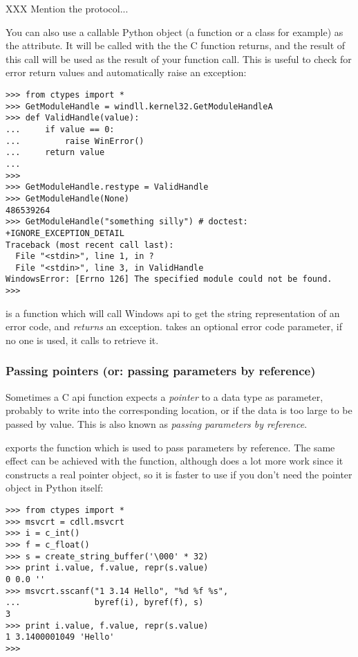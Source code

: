 XXX Mention the  protocol...

You can also use a callable Python object (a function or a class for
example) as the  attribute.  It will be called with the
 the C function returns, and the result of this call will
be used as the result of your function call. This is useful to check
for error return values and automatically raise an exception:
\begin{verbatim}
>>> from ctypes import *
>>> GetModuleHandle = windll.kernel32.GetModuleHandleA
>>> def ValidHandle(value):
...     if value == 0:
...         raise WinError()
...     return value
...
>>>
>>> GetModuleHandle.restype = ValidHandle
>>> GetModuleHandle(None)
486539264
>>> GetModuleHandle("something silly") # doctest: +IGNORE_EXCEPTION_DETAIL
Traceback (most recent call last):
  File "<stdin>", line 1, in ?
  File "<stdin>", line 3, in ValidHandle
WindowsError: [Errno 126] The specified module could not be found.
>>>
\end{verbatim}

 is a function which will call Windows 
api to get the string representation of an error code, and \emph{returns}
an exception.   takes an optional error code parameter, if
no one is used, it calls  to retrieve it.


\subsubsection{Passing pointers (or: passing parameters by reference)\label{ctypes-passing-pointers}}

Sometimes a C api function expects a \emph{pointer} to a data type as
parameter, probably to write into the corresponding location, or if
the data is too large to be passed by value. This is also known as
\emph{passing parameters by reference}.

 exports the  function which is used to pass
parameters by reference.  The same effect can be achieved with the
 function, although  does a lot more work since
it constructs a real pointer object, so it is faster to use 
if you don't need the pointer object in Python itself:
\begin{verbatim}
>>> from ctypes import *
>>> msvcrt = cdll.msvcrt
>>> i = c_int()
>>> f = c_float()
>>> s = create_string_buffer('\000' * 32)
>>> print i.value, f.value, repr(s.value)
0 0.0 ''
>>> msvcrt.sscanf("1 3.14 Hello", "%d %f %s",
...               byref(i), byref(f), s)
3
>>> print i.value, f.value, repr(s.value)
1 3.1400001049 'Hello'
>>>
\end{verbatim}


